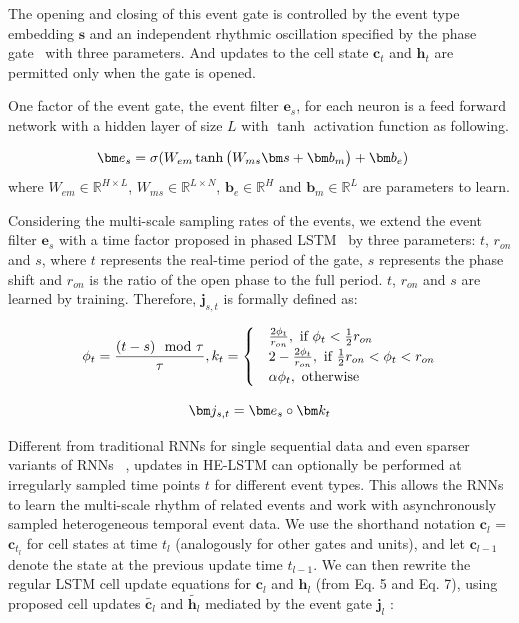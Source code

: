 \documentclass[letterpaper]{article} %
\begin{document}
 The
opening and closing of this event gate is controlled by the event type embedding $\bm s$ and an independent rhythmic oscillation specified by the phase gate~\cite{neil2016phased} with three parameters. 
And updates to the cell state $\bm c_t$ and $\bm h_t$ are permitted only when the gate is opened.

One factor of the event gate, the event filter $\bm e_{s}$, for each neuron is a feed forward network with a hidden layer of size $L$ with $\tanh$ activation function as following.

\begin{align}
\setlength{\abovedisplayskip}{3pt}
\bm e_s &=  \sigma(W_{em} \tanh\big (W_{ms} \bm s + \bm b_m \big) + \bm b_e)
\setlength{\belowdisplayskip}{3pt}
\end{align}
where $ W_{em} \in \mathbb{R}^{H\times L }$, $ W_{ms} \in \mathbb{R}^{L\times N}$, $\bm b_e\in \mathbb{R}^{H}$ and $\bm b_m\in \mathbb{R}^{L}$ are parameters to learn.


 Considering the multi-scale sampling rates of the events, we extend  the event filter $\bm e_s$ with a time factor proposed in phased LSTM~\cite{neil2016phased} by three parameters:  $t$, $r_{on}$ and $s$, where $t$ represents
the real-time period of the gate, $s$ represents the phase shift and
$r_{on}$ is the ratio of the open phase to the full period. $t$, $r_{on}$ and $s$ are learned by training. Therefore, $\bm j_{s,t}$ is formally defined as:

\begin{align}
\setlength{\abovedisplayskip}{3pt}
\phi_t = \frac{(t-s)\mod \tau}{\tau},
k_t = \begin{cases}
 & \frac{2\phi_t}{r_{on}},\text{ if } \phi_t < \frac{1}{2}r_{on} \\ 
 & 2-\frac{2\phi_t}{r_{on}},\text{ if } \frac{1}{2}r_{on} < \phi_t < r_{on}  \\ 
 & \alpha\phi_t,\text{ otherwise } 
\end{cases}
\setlength{\belowdisplayskip}{3pt}
\end{align}



\begin{equation}
\setlength{\abovedisplayskip}{3pt}
 \bm j_{s,t} = \bm e_s \circ \bm k_t
\setlength{\belowdisplayskip}{3pt}
\end{equation}


Different from traditional RNNs for single sequential data and even sparser variants of RNNs ~\cite{koutnik2014clockwork}, updates in HE-LSTM
can optionally be performed at irregularly sampled time points $t$ for different event types. 
This allows the RNNs to learn the multi-scale rhythm of related events and work with asynchronously sampled
heterogeneous temporal event data. 
We use the shorthand notation $\bm c_l$ = $\bm c_{t_l}$ for cell
states at time $t_l$ (analogously for other gates and units), and let $\bm c_{l-1}$ denote the state at the previous
update time $t_{l-1}$. We can then rewrite the regular LSTM cell update equations for $\bm c_l$ and $\bm h_l$ (from
Eq. 5 and Eq. 7), using proposed cell updates $\tilde{\bm c_l}$ and $\tilde{\bm h_l}$ mediated by the event gate $\bm j_l$ :
\end{document}
